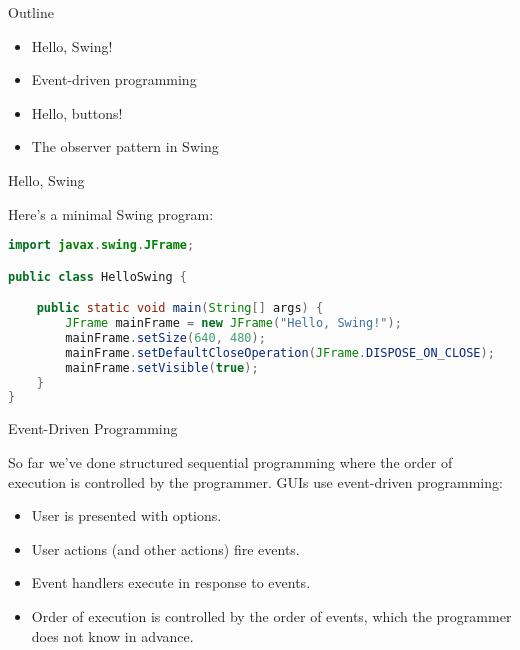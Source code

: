 \documentclass{beamer}
\author[Chris Simpkins] 
{Christopher Simpkins \\\texttt{chris.simpkins@gatech.edu}}
\institute[Georgia Tech] %
\date[CS 1331]{}
\begin{document}
\begin{frame}
  \titlepage
\end{frame}

\begin{frame}[fragile]{Outline}


\begin{itemize}
\item Hello, Swing!
\item Event-driven programming
\item Hello, buttons!
\item The observer pattern in Swing
\end{itemize}


\end{frame}

\begin{frame}[fragile]{Hello, Swing}


Here's a minimal Swing program:
\begin{lstlisting}[language=Java]
import javax.swing.JFrame;

public class HelloSwing {

    public static void main(String[] args) {
        JFrame mainFrame = new JFrame("Hello, Swing!");
        mainFrame.setSize(640, 480);
        mainFrame.setDefaultCloseOperation(JFrame.DISPOSE_ON_CLOSE);
        mainFrame.setVisible(true);
    }
}
\end{lstlisting}

\end{frame}

\begin{frame}[fragile]{Event-Driven Programming}


So far we've done structured sequential programming where the order of execution is controlled by the programmer.  GUIs use event-driven programming:
\begin{itemize}
\item User is presented with options.
\item User actions (and other actions) fire events.
\item Event handlers execute in response to events.
\item Order of execution is controlled by the order of events, which the programmer does not know in advance.
\end{itemize}


\end{frame}
\end{document}
